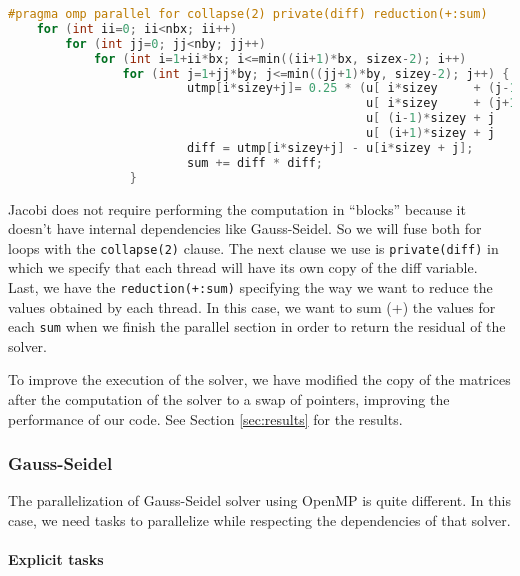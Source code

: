 \documentclass[a4paper, 10pt]{article}
\begin{document}
\begin{lstlisting}[language=c, caption={OpenMP pragma for Jacobi parallelization}, label={lst:jacobiopenmp}]
    #pragma omp parallel for collapse(2) private(diff) reduction(+:sum)
    for (int ii=0; ii<nbx; ii++)
        for (int jj=0; jj<nby; jj++) 
            for (int i=1+ii*bx; i<=min((ii+1)*bx, sizex-2); i++) 
                for (int j=1+jj*by; j<=min((jj+1)*by, sizey-2); j++) {
                         utmp[i*sizey+j]= 0.25 * (u[ i*sizey     + (j-1) ]+  // left
                                                  u[ i*sizey     + (j+1) ]+  // right
                                                  u[ (i-1)*sizey + j     ]+  // top
                                                  u[ (i+1)*sizey + j     ]); // bottom
                         diff = utmp[i*sizey+j] - u[i*sizey + j];
                         sum += diff * diff; 
                 }
\end{lstlisting}

Jacobi does not require performing the computation in ``blocks'' because it doesn't have internal dependencies like Gauss-Seidel. 
So we will fuse both for loops with the \texttt{collapse(2)} clause. The next clause we use is \texttt{private(diff)} in which we specify 
that each thread will have its own copy of the diff variable. Last, we have the \texttt{reduction(+:sum)} specifying 
the way we want to reduce the values obtained by each thread. In this case, we want to sum (+) the values for each \texttt{sum} when we 
finish the parallel section in order to return the residual of the solver.

To improve the execution of the solver, we have modified the copy of the matrices after the computation of the solver to a swap of pointers, improving the performance of our code. See Section \ref{sec:results} for the results.

\clearpage

\subsubsection{Gauss-Seidel}

The parallelization of Gauss-Seidel solver using OpenMP is quite different. In this case, we need tasks to parallelize while 
respecting the dependencies of that solver. 

\paragraph{Explicit tasks\\}
\end{document}
